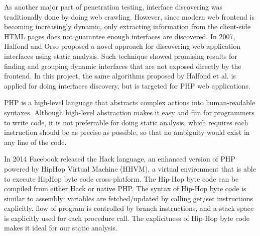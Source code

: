 As another major part of penetration testing, interface discovering was traditionally done by doing web crawling. However, since modern web frontend is becoming increasingly dynamic, only extracting information from the client-side HTML pages does not guarantee enough interfaces are discovered. In 2007, Halfond and Orso \cite{ref2} proposed a novel approach for discovering web application interfaces using static analysis. Such technique showed promising results for finding and grouping dynamic interfaces that are not exposed directly by the frontend.
In this project, the same algorithms proposed by Halfond et al. is applied for doing interfaces discovery, but is targeted for PHP web applications.

PHP is a high-level language that abstracts complex actions into human-readable syntaxes. Although high-level abstraction makes it easy and fun for programmers to write code, it is not preferrable for doing static analysis, which requires each instruction should be as precise as possible, so that no ambiguity would exist in any line of the code.

In 2014 Facebook released the Hack language, an enhanced version of PHP powered by HipHop Virtual Machine (HHVM), a virtual environment that is able to execute HipHop byte code cross-platform. The Hip-Hop byte code can be compiled from either Hack or native PHP. The syntax of Hip-Hop byte code is similar to assembly: variables are fetched/updated by calling get/set instructions explicitly, flow of program is controlled by branch instructions, and a stack space is explicitly used for each procedure call. The explicitness of Hip-Hop byte code makes it ideal for our static analysis.



